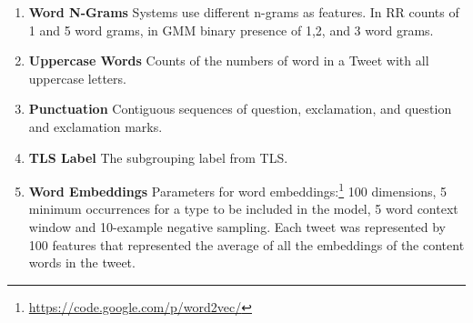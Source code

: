\documentclass[11pt,letterpaper]{article}
\begin{document}
\begin{enumerate}
\item {\bf Word N-Grams} Systems use different n-grams as features. In {\sc RR} counts of 1 and 5 word grams, in GMM binary presence of 1,2, and 3 word grams.

\item {\bf Uppercase Words} Counts of the numbers of word in a Tweet with all uppercase letters.

\item {\bf Punctuation} Contiguous sequences of question, exclamation, and question and exclamation marks.

\item {\bf TLS Label} The subgrouping label from TLS.

\item {\bf Word Embeddings} Parameters for word embeddings:\footnote{\url{https://code.google.com/p/word2vec/}} 100 dimensions, 5 minimum occurrences for a type to be included in the model, 5 word context window and 10-example negative sampling. Each tweet was represented by 100 features that represented the average of all the embeddings of the content words in the tweet. %
\end{enumerate}
\end{document}
